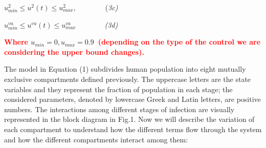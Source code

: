 \documentclass[a4paper]{article}
\begin{document}
$u_{\mathit{min}}^2{\leq}u^2\left(t\right){\leq}u_{\mathit{max}}^2,$\textcolor[rgb]{0.07450981,0.078431375,0.07450981}{\ \ \ \ \ \ \ \ (}\textit{\textcolor[rgb]{0.07450981,0.078431375,0.07450981}{3c)}}


$u_{\mathit{min}}^{\mathit{va}}{\leq}u^{\mathit{va}}\left(t\right){\leq}u_{\mathit{max}}^{\mathit{va}}$\textcolor[rgb]{0.07450981,0.078431375,0.07450981}{\ \ \ \ \ \ \ \ }\textit{\textcolor[rgb]{0.07450981,0.078431375,0.07450981}{(3d)}}

\textbf{\textcolor{red}{Where }} $u_{\mathit{min}}=0,u_{\mathit{max}}=0.9$\textbf{\textcolor{red}{\ (depending on the
type of the control we are considering the upper }}\textbf{\textcolor{red}{bound changes).}}


\bigskip


\bigskip

\textcolor[rgb]{0.07450981,0.078431375,0.07450981}{The model in Equation (1) subdivides human population into eight
mutually exclusive compartments defined previously. The uppercase letters are the state variables and they represent
the fraction of population in each stage; the considered parameters, denoted by lowercase Greek and Latin letters, are
positive numbers. The interactions among different stages of infection are visually represented in the block diagram in
Fig.1. Now we will describe the variation of each compartment to understand how the different terms flow through the
system and how the different compartments interact among them:}
\end{document}
